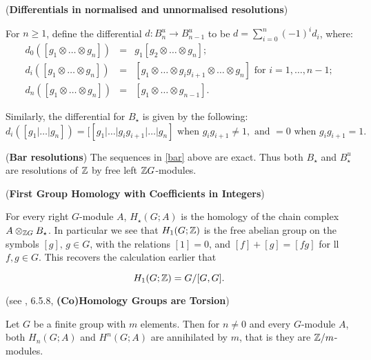 \begin{definition} (\textbf{Differentials in normalised and unnormalised resolutions})

For $n\geq 1$, define the differential $d: B_n^u \rightarrow B_{n-1}^u$ to be $d = \sum_{i=0}^n (-1)^i d_i$, where:
\begin{eqnarray}
d_0([g_1\otimes\dots\otimes g_n]) &=& g_1 [g_2 \otimes \dots \otimes g_n]; \nonumber\\
d_i([g_1\otimes\dots\otimes g_n]) &=& [g_1 \otimes \dots \otimes g_i g_{i+1} \otimes \dots \otimes g_n]\text{ for } i=1, \dots, n-1;\nonumber\\
d_n([g_1\otimes\dots\otimes g_n]) &=& [g_1 \otimes \dots \otimes g_{n-1}].\nonumber
\end{eqnarray}

Similarly, the differential for $B_\star$ is given by the following:
$$d_i([g_1|\dots|g_n]) = [[g_1|\dots|g_i g_{i+1} | \dots |g_n ] \text{ when }g_ig_{i+1}\neq 1, \text{ and } =0\text{ when } g_ig_{i+1}=1.$$
\end{definition}

\begin{theorem} (\textbf{Bar resolutions})
The sequences in \ref{bar} above are exact. Thus both $B_\star$ and $B_\star^u$ are resolutions of $\mathbb Z$ by free left $\mathbb Z G$-modules.
\end{theorem}

\begin{example}(\textbf{First Group Homology with Coefficients in Integers})

For every right $G$-module $A$, $H_\star (G;A)$ is the homology of the chain complex $A\otimes_{\mathbb Z G} B_\star$. In particular we see that $H_1(G; \mathbb Z)$ is the free abelian group on the symbols $[g], \, g\in G$, with the relations $[1]=0$, and $[f]+[g] = [fg]$ for ll $f,g\in G$. This recovers the calculation earlier that 

$$H_1(G; \mathbb Z ) = G/ [G,G].$$

\end{example}

\begin{theorem} (see \cite{Weibel}, 6.5.8, \textbf{(Co)Homology Groups are Torsion})

Let $G$ be a finite group with $m$ elements. Then for $n \neq 0$ and every $G$-module $A$, both $H_n(G;A)$ and $H^n(G;A)$ are annihilated by $m$, that is they are $\mathbb Z /m$-modules.

\end{theorem} 


